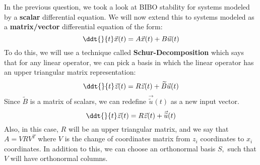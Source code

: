 

In the previous question, we took a look at BIBO stability for systems modeled by a \textbf{scalar} differential equation. 
We will now extend this to systems modeled as a \textbf{matrix/vector} differential equation of the form:
\begin{equation}\label{eqn:std}
  \ddt{}{t} \vec{x}(t) = A \vec{x}(t) + B \vec{u}(t)
\end{equation}
To do this, we will use a technique called \textbf{Schur-Decomposition} which says that for any linear operator, we can pick a basis in which the linear operator has an upper triangular matrix representation:
\begin{equation}\label{eqn:schur}
  \ddt{}{t} \vec{z}(t) = R \vec{z}(t) + \widetilde{B} \vec{u}(t)
\end{equation}
Since $\widetilde{B}$ is a matrix of scalars, we can redefine $\vec{\widetilde{{u}}}(t)$ as a new input vector.
\begin{equation}\label{eqn:input}
  \ddt{}{t} \vec{z}(t) = R \vec{z}(t) + \vec{\widetilde{{u}}}(t)
\end{equation}
Also, in this case, $R$ will be an upper triangular matrix, and we say that $A = VRV^{T}$ where $V$ is the change of coordinates matrix from $z_{i}$ coordinates to $x_{i}$ coordinates. 
In addition to this, we can choose an orthonormal basis $S,$ such that $V$ will have orthonormal columns.

